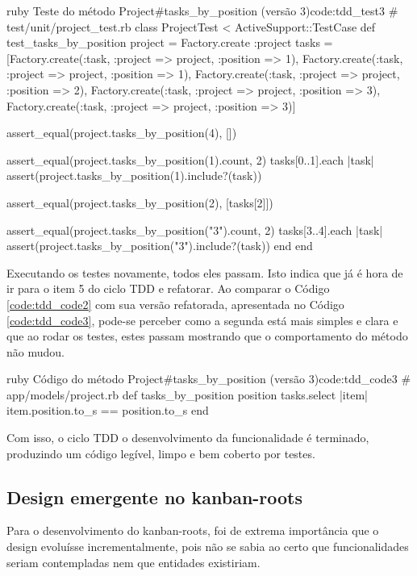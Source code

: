 \begin{mycode}{ruby}%
{Teste do método Project\#tasks\_by\_position (versão 3)}{code:tdd_test3}
# test/unit/project_test.rb
class ProjectTest < ActiveSupport::TestCase
  def test_tasks_by_position
    project = Factory.create :project
    tasks = [Factory.create(:task, :project => project, :position => 1),
             Factory.create(:task, :project => project, :position => 1),
             Factory.create(:task, :project => project, :position => 2),
             Factory.create(:task, :project => project, :position => 3),
             Factory.create(:task, :project => project, :position => 3)]

    assert_equal(project.tasks_by_position(4), [])

    assert_equal(project.tasks_by_position(1).count, 2)
    tasks[0..1].each { |task| assert(project.tasks_by_position(1).include?(task)) }

    assert_equal(project.tasks_by_position(2), [tasks[2]])

    assert_equal(project.tasks_by_position("3").count, 2)
    tasks[3..4].each { |task| assert(project.tasks_by_position("3").include?(task)) }
  end
end
\end{mycode}

Executando os testes novamente, todos eles passam. Isto indica que já é hora de ir para o item 5 do ciclo TDD e refatorar. Ao comparar o Código \ref{code:tdd_code2} com sua versão refatorada, apresentada no Código \ref{code:tdd_code3}, pode-se perceber como a segunda está mais simples e clara e que ao rodar os testes, estes passam mostrando que o comportamento do método não mudou.

\begin{mycode}{ruby}%
{Código do método Project\#tasks\_by\_position (versão 3)}{code:tdd_code3}
# app/models/project.rb
def tasks_by_position position
  tasks.select { |item| item.position.to_s == position.to_s }
end
\end{mycode}

Com isso, o ciclo TDD o desenvolvimento da funcionalidade é terminado, produzindo um código legível, limpo e bem coberto por testes.

\subsection{Design emergente no kanban-roots}
\label{sub:design_emergente_no_kanban_roots}

Para o desenvolvimento do kanban-roots, foi de extrema importância que o design evoluísse incrementalmente, pois não se sabia ao certo que
funcionalidades seriam contempladas nem que entidades existiriam.

